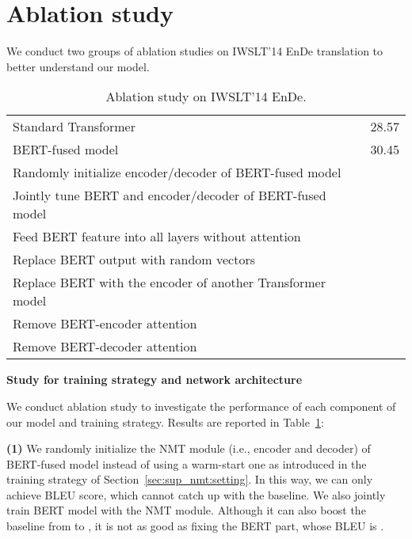 \documentclass{article} \usepackage{iclr2020_conference,times}
\begin{document}
\section{Ablation study}\label{sec:ablation_study}
We conduct two groups of ablation studies on IWSLT'14 EnDe translation to better understand our model.
\begin{table}[!htbp]
\centering
\caption{Ablation study on IWSLT'14 EnDe.}
\begin{tabular}{lc}
\toprule
Standard Transformer & 28.57\\
BERT-fused model & 30.45\\
\midrule
Randomly initialize encoder/decoder of BERT-fused model &  \\
Jointly tune BERT and encoder/decoder of BERT-fused model&  \\
\midrule
Feed BERT feature into all layers without attention &  \\
Replace BERT output with random vectors &  \\
Replace BERT with the encoder of another Transformer model& \\ 
\midrule
Remove BERT-encoder attention &  \\
Remove BERT-decoder attention &  \\
\bottomrule
\end{tabular}
\label{tab:results_iwslt_en-de-ablation-study}
\end{table}

\noindent\textbf{ Study for training strategy and network architecture}

We conduct ablation study to investigate the performance of each component of our model and training strategy. Results are reported in Table~\ref{tab:results_iwslt_en-de-ablation-study}:

\noindent\textbf{(1)} We randomly initialize the NMT module (i.e., encoder and decoder) of BERT-fused model instead of using a warm-start one as introduced in the training strategy of Section~\ref{sec:sup_nmt:setting}. In this way, we can only achieve  BLEU score, which cannot catch up with the baseline. We also jointly train BERT model with the NMT module. Although it can also boost the baseline from  to , it is not as good as fixing the BERT part, whose BLEU is . 
\end{document}
